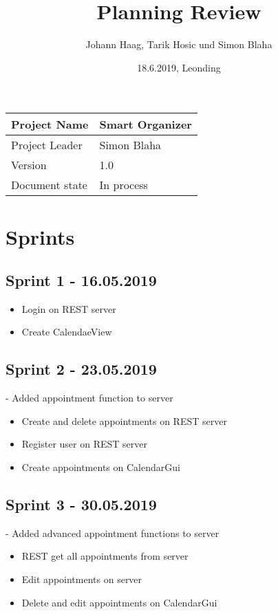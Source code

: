 \documentclass[12pt]{scrartcl}
\title{Planning Review}
\author{Johann Haag, Tarik Hosic und Simon Blaha}
\date{18.6.2019, Leonding}
\begin{document}
    \maketitle
    \begin{flushleft}
    \begin{tabular}{|l|l|}
    \hline
    Project Name & Smart Organizer \\ \hline
    Project Leader & Simon Blaha \\ \hline
    Version & 1.0\\ \hline
    Document state & In process \\ \hline
    \end{tabular}
    \end{flushleft}

    \pagebreak
    \tableofcontents
    \pagebreak

    \section{Sprints}
    \subsection{Sprint 1 - 16.05.2019}
    \begin{itemize}
        \item Login on REST server
        \item Create CalendaeView
    \end{itemize}

    \subsection{Sprint 2 - 23.05.2019}
    - Added appointment function to server
    \begin{itemize}
        \item Create and delete appointments on REST server
        \item Register user on REST server
        \item Create appointments on CalendarGui
    \end{itemize}

    \subsection{Sprint 3 - 30.05.2019}
    - Added advanced appointment functions to server
    \begin{itemize}
        \item REST get all appointments from server
        \item Edit appointments on server
        \item Delete and edit appointments on CalendarGui
    \end{itemize}
\end{document}
